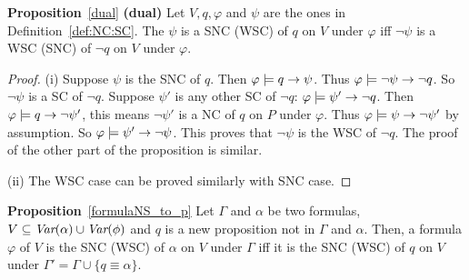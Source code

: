 \documentclass{article}
\begin{document}
\textbf{Proposition}~\ref{dual} \textbf{(dual)} Let $V,q,\varphi$ and $\psi$ are the ones in Definition~\ref{def:NC:SC}.
 The $\psi$ is a SNC (WSC) of $q$ on $V$ under $\varphi$ iff $\neg \psi$ is a WSC (SNC)
    of $\neg q$ on $V$ under $\varphi$.\\
\begin{proof}
     (i) Suppose $\psi$ is the SNC of $q$. Then $\varphi \models q \rightarrow \psi$. Thus $\varphi \models \neg \psi \rightarrow \neg q$. So $\neg \psi$ is a
SC of $\neg q$. Suppose $\psi'$ is any other SC of $\neg q$: $\varphi \models \psi' \rightarrow \neg q$. Then $\varphi \models q \rightarrow \neg \psi'$, this means $\neg \psi'$ is a NC of $q$ on $P$ under $\varphi$.
Thus $\varphi \models \psi \rightarrow \neg \psi'$ by assumption. So $\varphi \models \psi' \rightarrow \neg \psi$. This proves that $\neg \psi$ is the WSC of $\neg q$.
The proof of the other part of the proposition is similar.

(ii) The WSC case can be proved similarly with SNC case.
    \end{proof}




\textbf{Proposition}~\ref{formulaNS_to_p}   Let $\Gamma$ and $\alpha$ be two formulas, $V \subseteq \textit{Var}(\alpha) \cup \textit{Var}(\phi)$  and $q$ is a new proposition not in $\Gamma$ and $\alpha$. Then, a formula $\varphi$ of $V$ is the SNC (WSC) of $\alpha$ on $V$ under  $\Gamma$ iff it is the SNC (WSC) of $q$ on $V$ under $\Gamma' = \Gamma \cup \{q \equiv \alpha\}$.
\end{document}
